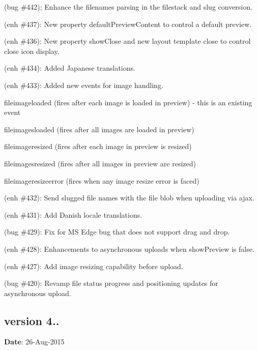 \begin{DoxyItemize}
\item (bug \#442); Enhance the filenames parsing in the filestack and slug conversion.
\item (enh \#437)\+: New property {\ttfamily default\+Preview\+Content} to control a default preview.
\item (enh \#436)\+: New property {\ttfamily show\+Close} and new layout template {\ttfamily close} to control close icon display.
\item (enh \#434)\+: Added Japanese translations.
\item (enh \#433)\+: Added new events for image handling.
\begin{DoxyItemize}
\item {\ttfamily fileimageloaded} (fires after each image is loaded in preview) -\/ this is an existing event
\item {\ttfamily fileimagesloaded} (fires after all images are loaded in preview)
\item {\ttfamily fileimageresized} (fires after each image in preview is resized)
\item {\ttfamily fileimagesresized} (fires after all images in preview are resized)
\item {\ttfamily fileimageresizeerror} (fires when any image resize error is faced)
\end{DoxyItemize}
\item (enh \#432)\+: Send slugged file names with the file blob when uploading via ajax.
\item (enh \#431)\+: Add Danish locale translations.
\item (bug \#429)\+: Fix for MS Edge bug that does not support drag and drop.
\item (enh \#428)\+: Enhancements to asynchronous uploads when {\ttfamily show\+Preview} is {\ttfamily false}.
\item (enh \#427)\+: Add image resizing capability before upload.
\item (bug \#420)\+: Revamp file status progress and positioning updates for asynchronous upload.
\end{DoxyItemize}

\subsection*{version 4..}

{\bfseries Date}\+: 26-\/\+Aug-\/2015


